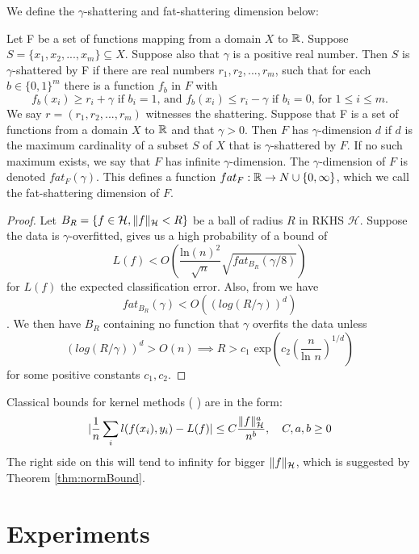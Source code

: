 \documentclass[twoside]{memoir}
\begin{document}
We define the $\gamma$-shattering and fat-shattering dimension below:
\begin{defn}
	Let F be a set of functions mapping from a domain $X$ to $\mathbb{R}$. Suppose $S = \{x_1, x_2, ..., x_m\} \subseteq X$.  Suppose also that $\gamma$ is a positive real number. Then $S$ is $\gamma$-shattered by F if there are real
	numbers $r_1, r_2,..., r_m$, such that for each $b \in \{0, 1\}^m$ there is a function $f_b$ in $F$ with
	\[
	f_b(x_i) \geq r_i + \gamma \text{ if } b_i = 1 \text{, and } f_b(x_i) \leq r_i - \gamma \text{ if } b_i = 0 \text{, for } 1 \leq i \leq m.
	\] We say $r = (r_1, r_2,..., r_m)$ witnesses the shattering.
	Suppose that F is a set of functions from a domain $X$ to $\mathbb{R}$ and that $\gamma > 0$. Then $F$ has $\gamma$-dimension $d$ if $d$ is the maximum	cardinality of a subset $S$ of $X$ that is $\gamma$-shattered by $F$. If no such maximum exists, we say that $F$ has infinite $\gamma$-dimension. The $\gamma$-dimension of $F$ is denoted $fat_F(\gamma)$. This defines a function $fat_F: \mathbb{R} \rightarrow N \cup \{0,\infty\}$, which we call the fat-shattering dimension of $F$.
\end{defn}
\begin{proof}
	Let $B_R = \{ f \in \mathcal{H}, \lVert f\rVert_\mathcal{H} < R \}$ be a ball of radius $R$ in RKHS $\mathcal{H}$. Suppose the data is $\gamma$-overfitted, \cite{LossFATBound} gives us a high probability of a bound of
	\[ L(f) < O(\frac{\text{ln}(n)^2}{\sqrt{n}}\sqrt{fat_{B_R}(\gamma/8)}) \] for $L(f)$ the expected classification error. Also, from \cite{ApproximationConcentration} we have \[fat_{B_R}(\gamma) < O((log(R/\gamma))^d)\].
	We then have $B_R$ containing no function that $\gamma$ overfits the data unless
	\[(log(R/\gamma))^d > O(n) \implies R > c_1 \text{ exp}(c_2(\frac{n}{\text{ln }n})^{1/d})\]
	for some positive constants $c_1, c_2$.
\end{proof}
Classical bounds for kernel methods (\cite{UnderstandKernel} ) are in the form:
\[ \lvert \frac{1}{n} \sum_{i}l(f(x_i),y_i) - L(f) \rvert \leq C \frac{\lVert f\rVert^a_\mathcal{H}}{n^b}, \hspace{1em} C,a,b \geq 0 \]
The right side on this will tend to infinity for bigger $\lVert f\rVert_\mathcal{H}$, which is suggested by Theorem \ref{thm:normBound}.

\chapter{Experiments}
\end{document}
